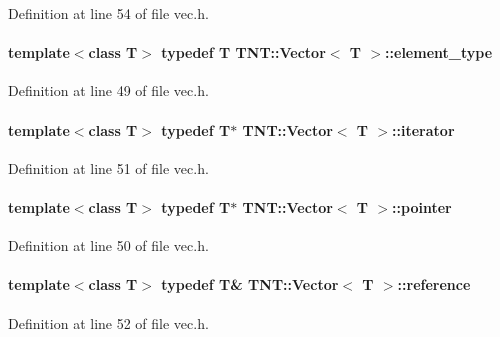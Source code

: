Definition at line 54 of file vec.h.

\paragraph[{element\_\-type}]{\setlength{\rightskip}{0pt plus 5cm}template$<$class T$>$ typedef T {\bf TNT::Vector}$<$ T $>$::{\bf element\_\-type}}\hfill\label{class_t_n_t_1_1_vector_af87934ec2406d242f6cc98035686bd1f}


Definition at line 49 of file vec.h.

\paragraph[{iterator}]{\setlength{\rightskip}{0pt plus 5cm}template$<$class T$>$ typedef T$\ast$ {\bf TNT::Vector}$<$ T $>$::{\bf iterator}}\hfill\label{class_t_n_t_1_1_vector_a7289b2334c4c28181bb4193fa32fc48a}


Definition at line 51 of file vec.h.

\paragraph[{pointer}]{\setlength{\rightskip}{0pt plus 5cm}template$<$class T$>$ typedef T$\ast$ {\bf TNT::Vector}$<$ T $>$::{\bf pointer}}\hfill\label{class_t_n_t_1_1_vector_aacdf3935ca58837be7e80d21d8e17c6d}


Definition at line 50 of file vec.h.

\paragraph[{reference}]{\setlength{\rightskip}{0pt plus 5cm}template$<$class T$>$ typedef T\& {\bf TNT::Vector}$<$ T $>$::{\bf reference}}\hfill\label{class_t_n_t_1_1_vector_a9cdf62749080406bdf3fbace264dac85}


Definition at line 52 of file vec.h.

